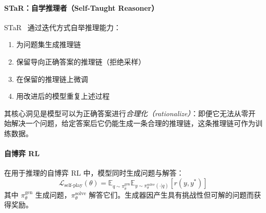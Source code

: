 \paragraph{STaR：自学推理者（Self-Taught Reasoner）}
\label{star-self-taught-reasoner}

STaR~\cite{zelikman2022star} 通过迭代方式自举推理能力：

\begin{enumerate}
  \item 为问题集生成推理链
  \item 保留导向正确答案的推理链（拒绝采样）
  \item 在保留的推理链上微调
  \item 用改进后的模型重复上述过程
\end{enumerate}

其核心洞见是模型可以为正确答案进行\emph{合理化（rationalize）}：即便它无法从零开始解决一个问题，给定答案后它仍能生成一条合理的推理链，这条推理链可作为训练数据。

\paragraph{自博弈 RL}
\label{self-play-rl}

在用于推理的自博弈 RL 中，模型同时生成问题与解答：
\begin{equation}
    \mathcal{L}_{\text{self-play}}(\theta) = \mathbb{E}_{q \sim \pi_\theta^{\text{gen}}} \mathbb{E}_{y \sim \pi_\theta^{\text{solve}}(\cdot|q)} \left[ r(y, y^*) \right]
\end{equation}
其中 $\pi_\theta^{\text{gen}}$ 生成问题，$\pi_\theta^{\text{solve}}$ 解答它们。生成器因产生具有挑战性但可解的问题而获得奖励。

